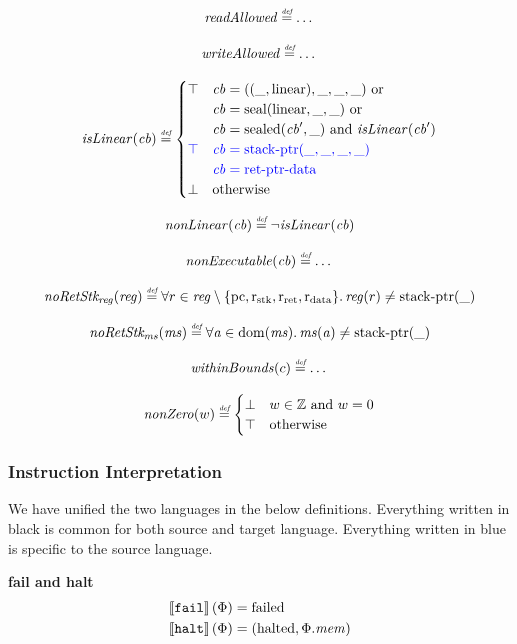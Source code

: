 \documentclass[a4paper]{article}
\newcommand{\defeq}{\stackrel{\textit{\tiny{def}}}{=}}
\newcommand{\sem}[1]{\left\llbracket #1 \right\rrbracket}
\newcommand{\dom}{\mathrm{dom}}
\newcommand{\tand}{\text{ and }}
\newcommand{\tor}{\text{ or }}
\newcommand{\totherwise}{\text{otherwise }}
\newcommand{\sourcecolor}[1]{\color{blue}}
\newcommand{\src}[1]{{\sourcecolor{} #1}}
\newcommand{\targetcolor}[1]{\color{black}}
\newcommand{\trg}[1]{{\targetcolor{} #1}}
\newcommand{\zinstr}[1]{\texttt{#1}}
\newcommand{\tfail}{\zinstr{\trg{fail}}}
\newcommand{\thalt}{\zinstr{\trg{halt}}}
\newcommand{\ints}{\mathbb{Z}}
\newcommand{\shareddom}[1]{\mathrm{#1}}
\newcommand{\stkptr}[1]{\mathrm{stack\text{-}ptr}(#1)}
\newcommand{\retptrd}{\mathrm{ret\text{-}ptr\text{-}data}}
\newcommand{\seal}[1]{\shareddom{seal}(#1)}
\newcommand{\sealed}[1]{\shareddom{sealed}(#1)}
\newcommand{\failed}{\mathrm{failed}}
\newcommand{\halted}{\mathrm{halted}}
\newcommand{\var}[1]{\mathit{#1}}
\newcommand{\reg}{\var{reg}}
\newcommand{\mem}{\var{mem}}
\newcommand{\ms}{\var{ms}}
\newcommand{\cb}{\var{cb}}
\newcommand{\aaddr}{\var{a}}
\newcommand{\pcreg}{\mathrm{pc}}
\newcommand{\rstk}{\mathrm{r}_\mathrm{stk}}
\newcommand{\rO}{\mathrm{r}_\mathrm{ret}}
\newcommand{\rret}{\rO}
\newcommand{\rdata}{\mathrm{r}_\mathrm{data}}
\newcommand{\plainlinearity}[1]{\mathrm{#1}}
\newcommand{\linear}{\plainlinearity{linear}}
\newcommand{\plainfun}[2]{
  \ifthenelse{\equal{#2}{}}
  {\mathit{#1}}
  {\mathit{#1}(#2)}
}
\newcommand{\nonExec}[1]{\plainfun{nonExecutable}{#1}}
\newcommand{\readAllowed}[1]{\plainfun{readAllowed}{#1}}
\newcommand{\writeAllowed}[1]{\plainfun{writeAllowed}{#1}}
\newcommand{\nonLinear}[1]{\plainfun{nonLinear}{#1}}
\newcommand{\isLinear}[1]{\plainfun{isLinear}{#1}}
\newcommand{\noRetStkReg}[1]{\plainfun{noRetStk_{reg}}{#1}}
\newcommand{\noRetStkMs}[1]{\plainfun{noRetStk_{ms}}{#1}}
\newcommand{\withinBounds}[1]{\plainfun{withinBounds}{#1}}
\newcommand{\nonZero}[1]{\plainfun{nonZero}{#1}}
\begin{document}
\[
  \readAllowed{} \defeq \dots
\]

\[
  \writeAllowed{} \defeq \dots
\]

\[
  \isLinear{\cb} \defeq
  \begin{cases}
    \top & 
    \arraycolsep=0pt
    \begin{array}[t]{l}
      \cb = ((\_,\linear),\_,\_,\_) \tor\\
      \cb = \seal{\linear,\_,\_} \tor\\
      \cb = \sealed{\cb',\_} \tand \isLinear{\cb'} 
    \end{array}\\
    \src{\top} & 
    \arraycolsep=0pt
    \begin{array}[t]{l}
      \src{\cb = \stkptr{\_,\_,\_,\_}}\\
      \src{\cb = \retptrd{}}
    \end{array}\\
    \bot & \totherwise
  \end{cases}
\]

\[
  \nonLinear{\cb} \defeq \neg \isLinear{\cb}
\]

\[
  \nonExec{\cb} \defeq \dots
\]


\[
  \noRetStkReg{\reg} \defeq \forall r \in \reg \setminus \{ \pcreg, \rstk, \rret, \rdata \} \ldotp \reg(r) \neq \stkptr{\_}
\]

\[
  \noRetStkMs{\ms} \defeq \forall \aaddr \in \dom(\ms) \ldotp \ms(\aaddr) \neq \stkptr{\_}
\]

\[
  \withinBounds{c} \defeq \dots
\]

\[
  \nonZero{w} \defeq
  \begin{cases}
    \bot & w \in \ints \tand w = 0 \\
    \top & \totherwise
  \end{cases}
\]

\subsubsection{Instruction Interpretation}
We have unified the two languages in the below definitions. Everything written in black is common for both source and target language. Everything written in \src{blue} is specific to the source language.

\noindent\textbf{fail and halt}\\
\begin{align*}
  \sem{\tfail}(\Phi) = & \; \failed \\
  \sem{\thalt}(\Phi) = & \; (\halted, \Phi.\mem)
\end{align*}
\end{document}
